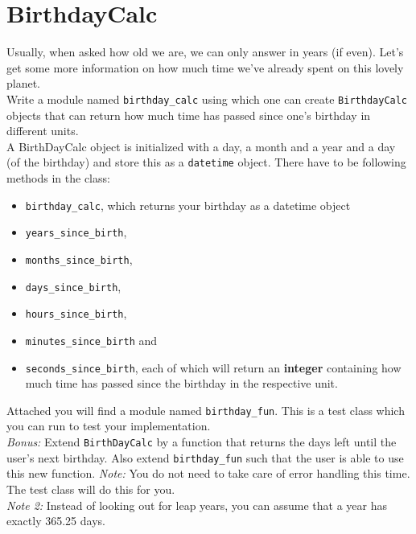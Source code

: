 \section{BirthdayCalc}
Usually, when asked how old we are, we can only answer in years (if even).
Let's get some more information on how much time we've already spent on this
lovely planet.\\
Write a module named \texttt{birthday\_calc} using which one can create
\texttt{BirthdayCalc} objects that can return how much time has passed since
one's birthday in different units.\\
A BirthDayCalc object is initialized with a day, a month and a year and a day
(of the birthday) and store this as a \texttt{datetime} object.
There have to be following methods in the class:
\begin{itemize}
	\item \texttt{birthday\_calc}, which returns your birthday as a datetime object
	\item \texttt{years\_since\_birth},
	\item \texttt{months\_since\_birth},
	\item \texttt{days\_since\_birth},
	\item \texttt{hours\_since\_birth},
	\item \texttt{minutes\_since\_birth} and
	\item \texttt{seconds\_since\_birth}, each of which will return an \textbf{integer}
	containing how much time has passed since the birthday in the respective unit.
\end{itemize}

\noindent Attached you will find a module named \texttt{birthday\_fun}. This is a test
class which you can run to test your implementation.\\
\textit{Bonus: }Extend \texttt{BirthDayCalc} by a function that returns the days
left until the user's next birthday. Also extend \texttt{birthday\_fun} such
that the user is able to use this new function.
\textit{Note: }You do not need to take care of error handling this time. The test
class will do this for you.\\
\textit{Note 2: }Instead of looking out for leap years, you can assume that a
year has exactly 365.25 days.





